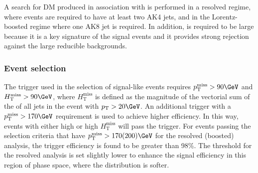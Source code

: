 A search for DM produced in association with \Hbb is performed in a resolved regime, where events are required to have at least two AK4 jets, and in the 
Lorentz-boosted regime where one AK8 jet is required. 
In addition, \MET is required to be large because it is a key signature of the signal events
and it provides strong rejection against the large reducible backgrounds. 

\subsubsection{Event selection}
The trigger used in the selection of signal-like events requires $\MET > 90\GeV$ and $H_{\mathrm{T}}^{\mathrm{miss}} > 90\GeV$, where $H_{\mathrm{T}}^{\mathrm{miss}}$ is defined as the magnitude of the vectorial sum of the \pt of all jets in the event with $p_{\mathrm{T}} > 20\GeV$. 
An additional trigger with a $\MET > 170\GeV$ requirement is used to achieve higher efficiency.
In this way, events with either high \MET or high $H_{\mathrm{T}}^{\mathrm{miss}}$ will pass the trigger.
For events passing the selection criteria that have $ \MET > 170 (200)\GeV$ for the resolved (boosted) analysis, the trigger efficiency is found to be greater than 98\%. 
The \MET threshold for the resolved analysis is set slightly lower to enhance the signal efficiency in this region of phase space, where the \MET distribution is softer.

